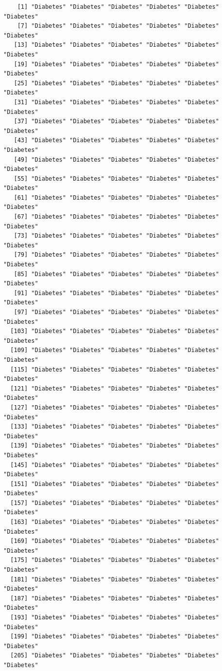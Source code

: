 \documentclass[
  letterpaper,
  DIV=11,
  numbers=noendperiod]{scrartcl}
\begin{document}
\begin{verbatim}
    [1] "Diabetes" "Diabetes" "Diabetes" "Diabetes" "Diabetes" "Diabetes"
    [7] "Diabetes" "Diabetes" "Diabetes" "Diabetes" "Diabetes" "Diabetes"
   [13] "Diabetes" "Diabetes" "Diabetes" "Diabetes" "Diabetes" "Diabetes"
   [19] "Diabetes" "Diabetes" "Diabetes" "Diabetes" "Diabetes" "Diabetes"
   [25] "Diabetes" "Diabetes" "Diabetes" "Diabetes" "Diabetes" "Diabetes"
   [31] "Diabetes" "Diabetes" "Diabetes" "Diabetes" "Diabetes" "Diabetes"
   [37] "Diabetes" "Diabetes" "Diabetes" "Diabetes" "Diabetes" "Diabetes"
   [43] "Diabetes" "Diabetes" "Diabetes" "Diabetes" "Diabetes" "Diabetes"
   [49] "Diabetes" "Diabetes" "Diabetes" "Diabetes" "Diabetes" "Diabetes"
   [55] "Diabetes" "Diabetes" "Diabetes" "Diabetes" "Diabetes" "Diabetes"
   [61] "Diabetes" "Diabetes" "Diabetes" "Diabetes" "Diabetes" "Diabetes"
   [67] "Diabetes" "Diabetes" "Diabetes" "Diabetes" "Diabetes" "Diabetes"
   [73] "Diabetes" "Diabetes" "Diabetes" "Diabetes" "Diabetes" "Diabetes"
   [79] "Diabetes" "Diabetes" "Diabetes" "Diabetes" "Diabetes" "Diabetes"
   [85] "Diabetes" "Diabetes" "Diabetes" "Diabetes" "Diabetes" "Diabetes"
   [91] "Diabetes" "Diabetes" "Diabetes" "Diabetes" "Diabetes" "Diabetes"
   [97] "Diabetes" "Diabetes" "Diabetes" "Diabetes" "Diabetes" "Diabetes"
  [103] "Diabetes" "Diabetes" "Diabetes" "Diabetes" "Diabetes" "Diabetes"
  [109] "Diabetes" "Diabetes" "Diabetes" "Diabetes" "Diabetes" "Diabetes"
  [115] "Diabetes" "Diabetes" "Diabetes" "Diabetes" "Diabetes" "Diabetes"
  [121] "Diabetes" "Diabetes" "Diabetes" "Diabetes" "Diabetes" "Diabetes"
  [127] "Diabetes" "Diabetes" "Diabetes" "Diabetes" "Diabetes" "Diabetes"
  [133] "Diabetes" "Diabetes" "Diabetes" "Diabetes" "Diabetes" "Diabetes"
  [139] "Diabetes" "Diabetes" "Diabetes" "Diabetes" "Diabetes" "Diabetes"
  [145] "Diabetes" "Diabetes" "Diabetes" "Diabetes" "Diabetes" "Diabetes"
  [151] "Diabetes" "Diabetes" "Diabetes" "Diabetes" "Diabetes" "Diabetes"
  [157] "Diabetes" "Diabetes" "Diabetes" "Diabetes" "Diabetes" "Diabetes"
  [163] "Diabetes" "Diabetes" "Diabetes" "Diabetes" "Diabetes" "Diabetes"
  [169] "Diabetes" "Diabetes" "Diabetes" "Diabetes" "Diabetes" "Diabetes"
  [175] "Diabetes" "Diabetes" "Diabetes" "Diabetes" "Diabetes" "Diabetes"
  [181] "Diabetes" "Diabetes" "Diabetes" "Diabetes" "Diabetes" "Diabetes"
  [187] "Diabetes" "Diabetes" "Diabetes" "Diabetes" "Diabetes" "Diabetes"
  [193] "Diabetes" "Diabetes" "Diabetes" "Diabetes" "Diabetes" "Diabetes"
  [199] "Diabetes" "Diabetes" "Diabetes" "Diabetes" "Diabetes" "Diabetes"
  [205] "Diabetes" "Diabetes" "Diabetes" "Diabetes" "Diabetes" "Diabetes"

\end{verbatim}
\end{document}
